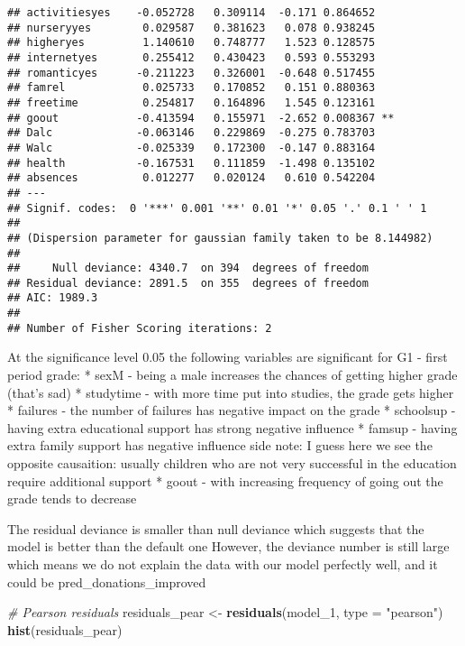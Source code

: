 \documentclass[
]{article}
\newenvironment{Shaded}{\begin{snugshade}}{\end{snugshade}}
\newcommand{\AttributeTok}[1]{\textcolor[rgb]{0.13,0.29,0.53}{#1}}
\newcommand{\CommentTok}[1]{\textcolor[rgb]{0.56,0.35,0.01}{\textit{#1}}}
\newcommand{\FunctionTok}[1]{\textcolor[rgb]{0.13,0.29,0.53}{\textbf{#1}}}
\newcommand{\NormalTok}[1]{#1}
\newcommand{\OtherTok}[1]{\textcolor[rgb]{0.56,0.35,0.01}{#1}}
\newcommand{\StringTok}[1]{\textcolor[rgb]{0.31,0.60,0.02}{#1}}
\begin{document}
\begin{verbatim}
## activitiesyes    -0.052728   0.309114  -0.171 0.864652    
## nurseryyes        0.029587   0.381623   0.078 0.938245    
## higheryes         1.140610   0.748777   1.523 0.128575    
## internetyes       0.255412   0.430423   0.593 0.553293    
## romanticyes      -0.211223   0.326001  -0.648 0.517455    
## famrel            0.025733   0.170852   0.151 0.880363    
## freetime          0.254817   0.164896   1.545 0.123161    
## goout            -0.413594   0.155971  -2.652 0.008367 ** 
## Dalc             -0.063146   0.229869  -0.275 0.783703    
## Walc             -0.025339   0.172300  -0.147 0.883164    
## health           -0.167531   0.111859  -1.498 0.135102    
## absences          0.012277   0.020124   0.610 0.542204    
## ---
## Signif. codes:  0 '***' 0.001 '**' 0.01 '*' 0.05 '.' 0.1 ' ' 1
## 
## (Dispersion parameter for gaussian family taken to be 8.144982)
## 
##     Null deviance: 4340.7  on 394  degrees of freedom
## Residual deviance: 2891.5  on 355  degrees of freedom
## AIC: 1989.3
## 
## Number of Fisher Scoring iterations: 2
\end{verbatim}

At the significance level 0.05 the following variables are significant
for G1 - first period grade: * sexM - being a male increases the chances
of getting higher grade (that's sad) * studytime - with more time put
into studies, the grade gets higher * failures - the number of failures
has negative impact on the grade * schoolsup - having extra educational
support has strong negative influence * famsup - having extra family
support has negative influence side note: I guess here we see the
opposite causaition: usually children who are not very successful in the
education require additional support * goout - with increasing frequency
of going out the grade tends to decrease

The residual deviance is smaller than null deviance which suggests that
the model is better than the default one However, the deviance number is
still large which means we do not explain the data with our model
perfectly well, and it could be pred\_donations\_improved

\begin{Shaded}
\begin{Highlighting}[]
\CommentTok{\# Pearson residuals}
\NormalTok{residuals\_pear }\OtherTok{\textless{}{-}} \FunctionTok{residuals}\NormalTok{(model\_1, }\AttributeTok{type =} \StringTok{"pearson"}\NormalTok{)}
\FunctionTok{hist}\NormalTok{(residuals\_pear)}
\end{Highlighting}
\end{Shaded}
\end{document}
